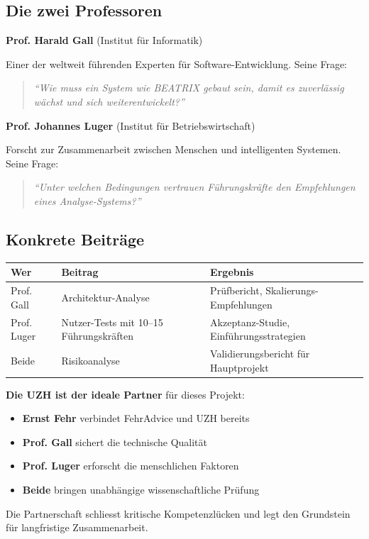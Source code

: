 \documentclass[11pt,a4paper]{article}
\begin{document}
\subsection{Die zwei Professoren}

\textbf{Prof. Harald Gall} (Institut für Informatik)

Einer der weltweit führenden Experten für Software-Entwicklung. Seine Frage:
\begin{quote}
\textit{``Wie muss ein System wie BEATRIX gebaut sein, damit es zuverlässig wächst und sich weiterentwickelt?''}
\end{quote}

\textbf{Prof. Johannes Luger} (Institut für Betriebswirtschaft)

Forscht zur Zusammenarbeit zwischen Menschen und intelligenten Systemen. Seine Frage:
\begin{quote}
\textit{``Unter welchen Bedingungen vertrauen Führungskräfte den Empfehlungen eines Analyse-Systems?''}
\end{quote}

\subsection{Konkrete Beiträge}

\begin{table}[h]
\centering
\begin{tabularx}{\textwidth}{lXX}
\toprule
\textbf{Wer} & \textbf{Beitrag} & \textbf{Ergebnis} \\
\midrule
Prof. Gall & Architektur-Analyse & Prüfbericht, Skalierungs-Empfehlungen \\
Prof. Luger & Nutzer-Tests mit 10--15 Führungskräften & Akzeptanz-Studie, Einführungsstrategien \\
Beide & Risikoanalyse & Validierungsbericht für Hauptprojekt \\
\bottomrule
\end{tabularx}
\end{table}

\begin{summarybox}
\textbf{Die UZH ist der ideale Partner} für dieses Projekt:

\begin{itemize}[noitemsep]
    \item \textbf{Ernst Fehr} verbindet FehrAdvice und UZH bereits
    \item \textbf{Prof. Gall} sichert die technische Qualität
    \item \textbf{Prof. Luger} erforscht die menschlichen Faktoren
    \item \textbf{Beide} bringen unabhängige wissenschaftliche Prüfung
\end{itemize}

Die Partnerschaft schliesst kritische Kompetenzlücken und legt den Grundstein für langfristige Zusammenarbeit.
\end{summarybox}
\end{document}
